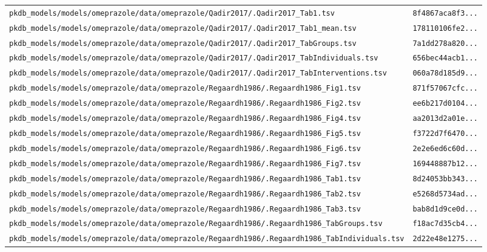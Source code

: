 \begin{longtable}{ll}
\texttt{pkdb\_models/models/omeprazole/data/omeprazole/Qadir2017/.Qadir2017\_Tab1.tsv} & \texttt{8f4867aca8f3...} \\
\texttt{pkdb\_models/models/omeprazole/data/omeprazole/Qadir2017/.Qadir2017\_Tab1\_mean.tsv} & \texttt{178110106fe2...} \\
\texttt{pkdb\_models/models/omeprazole/data/omeprazole/Qadir2017/.Qadir2017\_TabGroups.tsv} & \texttt{7a1dd278a820...} \\
\texttt{pkdb\_models/models/omeprazole/data/omeprazole/Qadir2017/.Qadir2017\_TabIndividuals.tsv} & \texttt{656bec44acb1...} \\
\texttt{pkdb\_models/models/omeprazole/data/omeprazole/Qadir2017/.Qadir2017\_TabInterventions.tsv} & \texttt{060a78d185d9...} \\
\texttt{pkdb\_models/models/omeprazole/data/omeprazole/Regaardh1986/.Regaardh1986\_Fig1.tsv} & \texttt{871f57067cfc...} \\
\texttt{pkdb\_models/models/omeprazole/data/omeprazole/Regaardh1986/.Regaardh1986\_Fig2.tsv} & \texttt{ee6b217d0104...} \\
\texttt{pkdb\_models/models/omeprazole/data/omeprazole/Regaardh1986/.Regaardh1986\_Fig4.tsv} & \texttt{aa2013d2a01e...} \\
\texttt{pkdb\_models/models/omeprazole/data/omeprazole/Regaardh1986/.Regaardh1986\_Fig5.tsv} & \texttt{f3722d7f6470...} \\
\texttt{pkdb\_models/models/omeprazole/data/omeprazole/Regaardh1986/.Regaardh1986\_Fig6.tsv} & \texttt{2e2e6ed6c60d...} \\
\texttt{pkdb\_models/models/omeprazole/data/omeprazole/Regaardh1986/.Regaardh1986\_Fig7.tsv} & \texttt{169448887b12...} \\
\texttt{pkdb\_models/models/omeprazole/data/omeprazole/Regaardh1986/.Regaardh1986\_Tab1.tsv} & \texttt{8d24053bb343...} \\
\texttt{pkdb\_models/models/omeprazole/data/omeprazole/Regaardh1986/.Regaardh1986\_Tab2.tsv} & \texttt{e5268d5734ad...} \\
\texttt{pkdb\_models/models/omeprazole/data/omeprazole/Regaardh1986/.Regaardh1986\_Tab3.tsv} & \texttt{bab8d1d9ce0d...} \\
\texttt{pkdb\_models/models/omeprazole/data/omeprazole/Regaardh1986/.Regaardh1986\_TabGroups.tsv} & \texttt{f18ac7d35cb4...} \\
\texttt{pkdb\_models/models/omeprazole/data/omeprazole/Regaardh1986/.Regaardh1986\_TabIndividuals.tsv} & \texttt{2d22e48e1275...} \\

\end{longtable}

